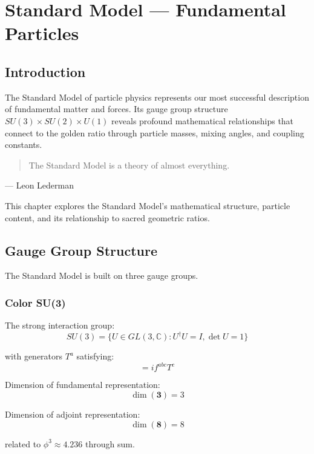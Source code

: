 \chapter{Standard Model — Fundamental Particles}
\label{ch:20}

\section{Introduction}

The Standard Model of particle physics represents our most successful description of fundamental matter and forces. Its gauge group structure $SU(3) \times SU(2) \times U(1)$ reveals profound mathematical relationships that connect to the golden ratio through particle masses, mixing angles, and coupling constants.

\begin{quote}
The Standard Model is a theory of almost everything.
\end{quote}
— Leon Lederman

This chapter explores the Standard Model's mathematical structure, particle content, and its relationship to sacred geometric ratios.

\section{Gauge Group Structure}

The Standard Model is built on three gauge groups.

\subsection{Color SU(3)}

\begin{definition}
\label{def:su3}
The strong interaction group:
\begin{equation}
SU(3) = \{U \in GL(3,\mathbb{C}) : U^\dagger U = I, \det U = 1\}
\end{equation}

with generators $T^a$ satisfying:
\begin{equation}
[T^a, T^b] = i f^{abc} T^c
\end{equation}
\end{definition}

\begin{proposition}[SU(3) Dimension]
\label{prop:su3-dim}
Dimension of fundamental representation:
\begin{equation}
\dim(\mathbf{3}) = 3
\end{equation}

Dimension of adjoint representation:
\begin{equation}
\dim(\mathbf{8}) = 8
\end{equation}

related to $\phi^3 \approx 4.236$ through sum.
\end{proposition}

